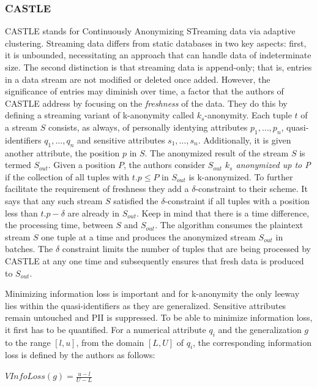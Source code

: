 \subsubsection{CASTLE\label{lit:castle}}
CASTLE stands for Continuously Anonymizing STreaming data via adaptive clustering. Streaming data differs from static databases in two key aspects: first, it is unbounded, necessitating an approach that can handle data of indeterminate size. The second distinction is that streaming data is append-only; that is, entries in a data stream are not modified or deleted once added. However, the significance of entries may diminish over time, a factor that the authors of CASTLE address by focusing on the \textit{freshness} of the data. They do this by defining a streaming variant of k-anonymity called $k_s$-anonymity. Each tuple $t$ of a stream $S$ consists, as always, of personally identying attributes $p_1, \dots, p_n$, quasi-identifiers $q_1, \dots, q_n$ and sensitive attributes $s_1,\dots, s_n$. Additionally, it is given another attribute, the position $p$ in $S$. The anonymized result of the stream $S$ is termed $S_{out}$. Given a position $P$, the authors consider $S_{out}$ \textit{$k_s$ anonymized up to P} if the collection of all tuples with $t.p \le P$ in $S_{out}$ is k-anonymized. To further facilitate the requirement of freshness they add a $\delta$-constraint to their scheme. It says that any such stream $S$ satisfied the $\delta$-constraint if all tuples with a position less than $t.p - \delta$ are already in $S_{out}$. Keep in mind that there is a time difference, the processing time, between $S$ and $S_{out}$. The algorithm consumes the plaintext stream $S$ one tuple at a time and produces the anonymized stream $S_{out}$ in batches. The $\delta$ constraint limits the number of tuples that are being processed by CASTLE at any one time and subsequently ensures that fresh data is produced to $S_{out}$. \par
Minimizing information loss is important and for k-anonymity the only leeway lies within the quasi-identifiers as they are generalized. Sensitive attributes remain untouched and \ac{PII} is suppressed. To be able to minimize information loss, it first has to be quantified. For a numerical attribute $q_i$ and the generalization $g$ to the range $[l,u]$, from the domain $[L, U]$ of $q_i$, the corresponding information loss is defined by the authors as follows: 

\begin{center}
    $VInfoLoss(g) = \frac{u - l}{U - L}$
\end{center}

